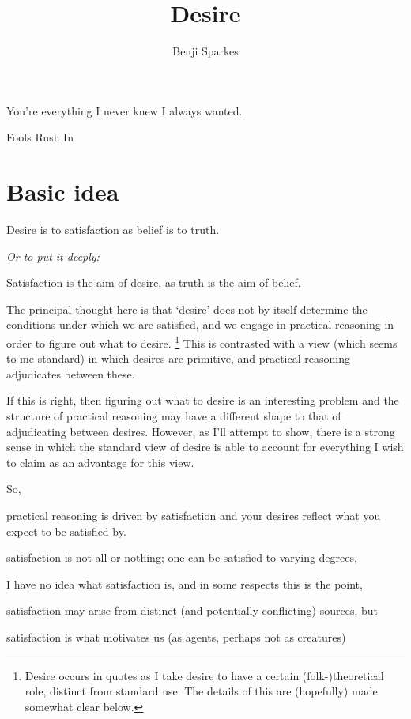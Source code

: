 \documentclass[10pt]{article}
\title{Desire}
\author{Benji Sparkes}
\begin{document}
\maketitle
\epigraph{You're everything I never knew I always wanted.}{Fools Rush In}



\section{Basic idea}
\label{sec:basic-idea}


\begin{center}
  Desire is to satisfaction as belief is to truth.

  \emph{Or to put it deeply:}

  Satisfaction is the aim of desire, as truth is the aim of belief.
\end{center}

The principal thought here is that `desire' does not by itself determine the conditions under which we are satisfied, and we engage in practical reasoning in order to figure out what to desire.\nolinebreak
\footnote{Desire occurs in quotes as I take desire to have a certain (folk-)theoretical role, distinct from standard use.
  The details of this are (hopefully) made somewhat clear below.}
This is contrasted with a view (which seems to me standard) in which desires are primitive, and practical reasoning adjudicates between these.

If this is right, then figuring out what to desire is an interesting problem and the structure of practical reasoning may have a different shape to that of adjudicating between desires.
However, as I'll attempt to show, there is a strong sense in which the standard view of desire is able to account for everything I wish to claim as an advantage for this view.

So, \nolinebreak
\begin{enumerate*}[label=\alph*)]
\item practical reasoning is driven by satisfaction and your desires reflect what you expect to be satisfied by.
\item satisfaction is not all-or-nothing; one can be satisfied to varying degrees,
\item I have no idea what satisfaction is, and in some respects this is the point,
\item satisfaction may arise from distinct (and potentially conflicting) sources, but
\item satisfaction is what motivates us (as agents, perhaps not as creatures)
\end{enumerate*}
\end{document}
